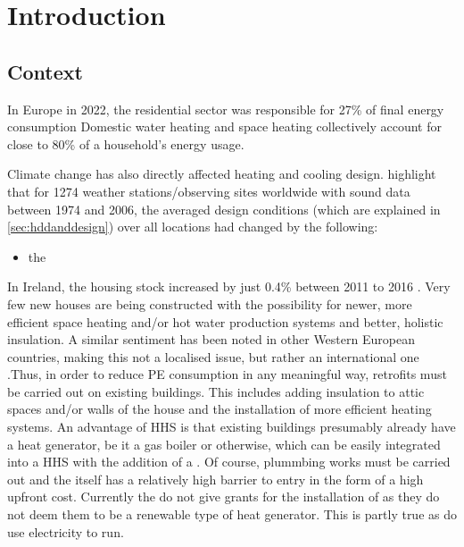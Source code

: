 \chapter{Introduction}\label{ch:intro}



\section{Context}

In Europe in 2022, the  residential sector was responsible for 27\% of final energy consumption \cite{}
Domestic water heating and space heating collectively account for close to 80\% of a household's energy usage. \cite{}

Climate change has also directly affected heating and cooling design. \citeauthor{owen_ashrae_2009} highlight that for \num{1274} weather stations/observing sites worldwide with sound data between 1974 and 2006, the averaged design conditions (which are explained in \cref{sec:hddanddesign}) over all locations had changed by the following:
\begin{itemize}
    \item the 
\end{itemize}

In Ireland, the housing stock increased by just 0.4\% between 2011 to 2016 \cite{cso_2020}. Very few new houses are being constructed with the possibility for newer, more efficient space heating and/or hot water production systems and better, holistic insulation. A similar sentiment has been noted in other Western European countries, making this not a localised issue, but rather an international one \cite{klein_numerical_2014, dongellini_influence_2021} .Thus, in order to reduce \ac{PE} consumption in any meaningful way, retrofits must be carried out on existing buildings. This includes adding insulation to attic spaces and/or walls of the house and the installation of more efficient heating systems. An advantage of \acs{HHS} is that existing buildings presumably already have a heat generator, be it a gas boiler or otherwise, which can be easily integrated into a \ac{HHS} with the addition of a \HP. Of course, plummbing works must be carried out and the \HP itself has a relatively high barrier to entry in the form of a high upfront cost. Currently the \citeauthor{seai_2020} do not give grants for the installation of \HPs as they do not deem them to be a renewable type of heat generator. This is partly true as \HPs do use electricity to run. 

